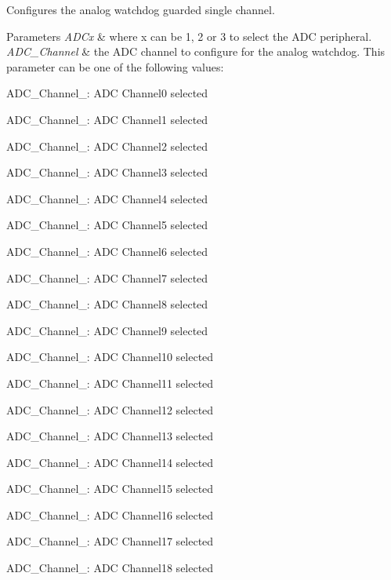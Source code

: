 Configures the analog watchdog guarded single channel. 


\begin{DoxyParams}{Parameters}
{\em A\+D\+Cx} & where x can be 1, 2 or 3 to select the A\+DC peripheral. \\
\hline
{\em A\+D\+C\+\_\+\+Channel} & the A\+DC channel to configure for the analog watchdog. This parameter can be one of the following values\+: \begin{DoxyItemize}
\item A\+D\+C\+\_\+\+Channel\+\_\+: A\+DC Channel0 selected \item A\+D\+C\+\_\+\+Channel\+\_\+: A\+DC Channel1 selected \item A\+D\+C\+\_\+\+Channel\+\_\+: A\+DC Channel2 selected \item A\+D\+C\+\_\+\+Channel\+\_\+: A\+DC Channel3 selected \item A\+D\+C\+\_\+\+Channel\+\_\+: A\+DC Channel4 selected \item A\+D\+C\+\_\+\+Channel\+\_\+: A\+DC Channel5 selected \item A\+D\+C\+\_\+\+Channel\+\_\+: A\+DC Channel6 selected \item A\+D\+C\+\_\+\+Channel\+\_\+: A\+DC Channel7 selected \item A\+D\+C\+\_\+\+Channel\+\_\+: A\+DC Channel8 selected \item A\+D\+C\+\_\+\+Channel\+\_\+: A\+DC Channel9 selected \item A\+D\+C\+\_\+\+Channel\+\_\+: A\+DC Channel10 selected \item A\+D\+C\+\_\+\+Channel\+\_\+: A\+DC Channel11 selected \item A\+D\+C\+\_\+\+Channel\+\_\+: A\+DC Channel12 selected \item A\+D\+C\+\_\+\+Channel\+\_\+: A\+DC Channel13 selected \item A\+D\+C\+\_\+\+Channel\+\_\+: A\+DC Channel14 selected \item A\+D\+C\+\_\+\+Channel\+\_\+: A\+DC Channel15 selected \item A\+D\+C\+\_\+\+Channel\+\_\+: A\+DC Channel16 selected \item A\+D\+C\+\_\+\+Channel\+\_\+: A\+DC Channel17 selected \item A\+D\+C\+\_\+\+Channel\+\_\+: A\+DC Channel18 selected \end{DoxyItemize}
\\
\hline
\end{DoxyParams}

